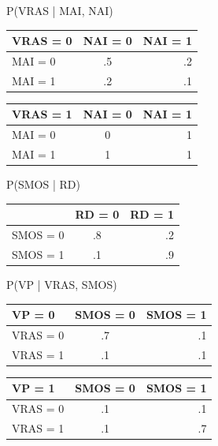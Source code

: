 \documentclass[solution, letterpaper]{cs121}
\begin{document}
\begin{empfile}
P(VRAS | MAI, NAI)\\
\begin{center}
\begin{tabular}{ l |c r }
   VRAS = 0 & NAI = 0 & NAI = 1 \\
   \hline
  MAI = 0 & .5 & .2 \\
  MAI = 1 & .2 & .1 \\
\end{tabular}
\end{center}

\begin{center}
\begin{tabular}{ l |c r }
   VRAS = 1 & NAI = 0 & NAI = 1 \\
   \hline
  MAI = 0 & 0 & 1 \\
  MAI = 1 & 1 & 1 \\
\end{tabular}
\end{center}


P(SMOS | RD)\\
\begin{center}
\begin{tabular}{ l |c r }
   & RD = 0 & RD = 1 \\
   \hline
  SMOS = 0 & .8 & .2 \\
  SMOS = 1 & .1 & .9 \\
\end{tabular}
\end{center}


P(VP | VRAS, SMOS)\\
\begin{center}
\begin{tabular}{ l |c r }
   VP = 0 & SMOS = 0 & SMOS = 1 \\
   \hline
  VRAS = 0 & .7 & .1 \\
  VRAS = 1 & .1 & .1 \\
\end{tabular}
\end{center}

\begin{center}
\begin{tabular}{ l |c r }
   VP = 1 & SMOS = 0 & SMOS = 1 \\
   \hline
  VRAS = 0 & .1 & .1 \\
  VRAS = 1 & .1 & .7 \\
\end{tabular}
\end{center}


\end{empfile}
\end{document}

